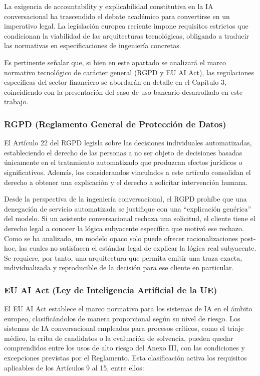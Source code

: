 \documentclass[12pt,a4paper]{report}
\begin{document}
La exigencia de accountability y explicabilidad constitutiva en la IA conversacional ha trascendido el debate académico para convertirse en un imperativo legal. La legislación europea reciente impone requisitos estrictos que condicionan la viabilidad de las arquitecturas tecnológicas, obligando a traducir las normativas en especificaciones de ingeniería concretas.

Es pertinente señalar que, si bien en este apartado se analizará el marco normativo tecnológico de carácter general (RGPD y EU AI Act), las regulaciones específicas del sector financiero se abordarán en detalle en el Capítulo 3, coincidiendo con la presentación del caso de uso bancario desarrollado en este trabajo.

\subsubsection{RGPD (Reglamento General de Protección de Datos)}

El Artículo 22 del RGPD \cite{gdpr2016} legisla sobre las decisiones individuales automatizadas, estableciendo el derecho de las personas a no ser objeto de decisiones basadas únicamente en el tratamiento automatizado que produzcan efectos jurídicos o significativos. Además, los considerandos vinculados a este artículo consolidan el derecho a obtener una explicación y el derecho a solicitar intervención humana.

Desde la perspectiva de la ingeniería conversacional, el RGPD prohíbe que una denegación de servicio automatizada se justifique con una ``explicación genérica'' del modelo. Si un asistente conversacional rechaza una solicitud, el cliente tiene el derecho legal a conocer la lógica subyacente específica que motivó ese rechazo. Como se ha analizado, un modelo opaco solo puede ofrecer racionalizaciones post-hoc, las cuales no satisfacen el estándar legal de explicar la lógica real subyacente. Se requiere, por tanto, una arquitectura que permita emitir una traza exacta, individualizada y reproducible de la decisión para ese cliente en particular.

\subsubsection{EU AI Act (Ley de Inteligencia Artificial de la UE)}

El EU AI Act \cite{euaiAct2024} establece el marco normativo para los sistemas de IA en el ámbito europeo, clasificándolos de manera proporcional según su nivel de riesgo. Los sistemas de IA conversacional empleados para procesos críticos, como el triaje médico, la criba de candidatos o la evaluación de solvencia, pueden quedar comprendidos entre los usos de alto riesgo del Anexo III, con las condiciones y excepciones previstas por el Reglamento. Esta clasificación activa los requisitos aplicables de los Artículos 9 al 15, entre ellos:
\end{document}
